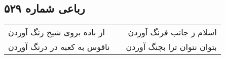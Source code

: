 \begin{center}
\section*{رباعی شماره ۵۲۹}
\label{sec:sh529}
\begin{longtable}{l p{0.5cm} r}
از باده بروی شیخ رنگ آوردن
&&
اسلام ز جانب فرنگ آوردن
\\
ناقوس به کعبه در درنگ آوردن
&&
بتوان نتوان ترا بچنگ آوردن
\\
\end{longtable}
\end{center}
